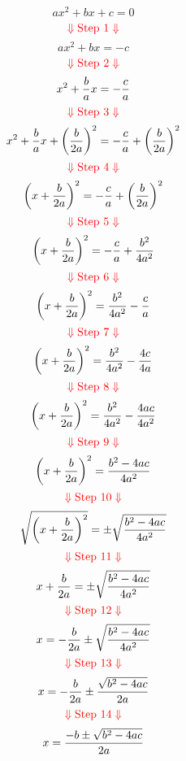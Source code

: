 \documentclass[11pt,letterpaper]{article}
\newcommand{\fstep}[1]{$$\color{red}{\Downarrow\mbox{Step #1}\Downarrow}$$}
\begin{document}
\begin{sidewaysfigure}
\begin{multicols}{2}
\setcounter{equation}{-1}
\begin{equation}
ax^2+bx+c=0
\end{equation}
\fstep{1}
\begin{equation}
ax^2+bx=-c
\end{equation}
\fstep{2}
\begin{equation}
x^2+{b\over a}x=-{c\over a}
\end{equation}
\fstep{3}
\begin{equation}
x^2+{b\over a}x+\left({b\over 2a}\right)^2=-{c\over a}+\left({b\over 2a}\right)^2
\end{equation}
\fstep{4}
\begin{equation}
\left(x+{b\over 2a}\right)^2=-{c\over a}+\left({b\over 2a}\right)^2
\end{equation}
\fstep{5}
\begin{equation}
\left(x+{b\over 2a}\right)^2=-{c\over a}+{b^2\over 4a^2}
\end{equation}
\fstep{6}
\begin{equation}
\left(x+{b\over 2a}\right)^2={b^2\over 4a^2}-{c\over a}
\end{equation}
\fstep{7}
\begin{equation}
\left(x+{b\over 2a}\right)^2={b^2\over 4a^2}-{4c\over 4a}
\end{equation}
\fstep{8}
\begin{equation}
\left(x+{b\over 2a}\right)^2={b^2\over 4a^2}-{4ac\over 4a^2}
\end{equation}
\fstep{9}
\begin{equation}
\left(x+{b\over 2a}\right)^2={b^2-4ac\over 4a^2}
\end{equation}
\fstep{10}
\begin{equation}
\sqrt{\left(x+{b\over 2a}\right)^2}=\pm\sqrt{{b^2-4ac\over 4a^2}}
\end{equation}
\fstep{11}
\begin{equation}
x+{b\over 2a}=\pm\sqrt{{b^2-4ac\over 4a^2}}
\end{equation}
\fstep{12}
\begin{equation}
x=-{b\over 2a}\pm\sqrt{{b^2-4ac\over 4a^2}}
\end{equation}
\fstep{13}
\begin{equation}
x=-{b\over 2a}\pm{\sqrt{b^2-4ac}\over 2a}
\end{equation}
\fstep{14}
\begin{equation}
x={-b\pm\sqrt{b^2-4ac}\over 2a}
\end{equation}
\end{multicols}
\end{sidewaysfigure}
\end{document}
